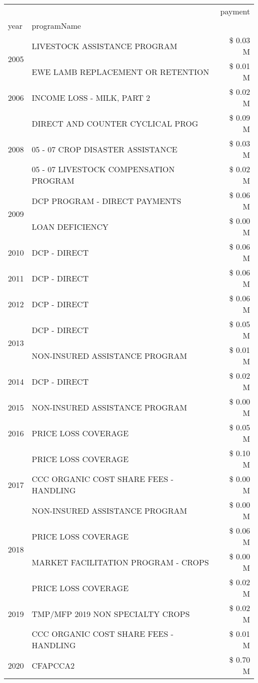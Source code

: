 \begin{tabular}{llr}
\toprule
 &  & payment \\
year & programName &  \\
\midrule
\multirow[t]{2}{*}{2005} & LIVESTOCK ASSISTANCE PROGRAM & \$ 0.03 M \\
 & EWE LAMB REPLACEMENT OR RETENTION & \$ 0.01 M \\
\cline{1-3}
2006 & INCOME LOSS - MILK, PART 2 & \$ 0.02 M \\
\cline{1-3}
\multirow[t]{3}{*}{2008} & DIRECT AND COUNTER CYCLICAL PROG & \$ 0.09 M \\
 & 05 - 07 CROP DISASTER ASSISTANCE & \$ 0.03 M \\
 & 05 - 07 LIVESTOCK COMPENSATION PROGRAM & \$ 0.02 M \\
\cline{1-3}
\multirow[t]{2}{*}{2009} & DCP PROGRAM - DIRECT PAYMENTS & \$ 0.06 M \\
 & LOAN DEFICIENCY & \$ 0.00 M \\
\cline{1-3}
2010 & DCP - DIRECT & \$ 0.06 M \\
\cline{1-3}
2011 & DCP - DIRECT & \$ 0.06 M \\
\cline{1-3}
2012 & DCP - DIRECT & \$ 0.06 M \\
\cline{1-3}
\multirow[t]{2}{*}{2013} & DCP - DIRECT & \$ 0.05 M \\
 & NON-INSURED ASSISTANCE PROGRAM & \$ 0.01 M \\
\cline{1-3}
2014 & DCP - DIRECT & \$ 0.02 M \\
\cline{1-3}
2015 & NON-INSURED ASSISTANCE PROGRAM & \$ 0.00 M \\
\cline{1-3}
2016 & PRICE LOSS COVERAGE & \$ 0.05 M \\
\cline{1-3}
\multirow[t]{3}{*}{2017} & PRICE LOSS COVERAGE & \$ 0.10 M \\
 & CCC ORGANIC COST SHARE FEES - HANDLING & \$ 0.00 M \\
 & NON-INSURED ASSISTANCE PROGRAM & \$ 0.00 M \\
\cline{1-3}
\multirow[t]{2}{*}{2018} & PRICE LOSS COVERAGE & \$ 0.06 M \\
 & MARKET FACILITATION PROGRAM - CROPS & \$ 0.00 M \\
\cline{1-3}
\multirow[t]{3}{*}{2019} & PRICE LOSS COVERAGE & \$ 0.02 M \\
 & TMP/MFP 2019 NON SPECIALTY CROPS & \$ 0.02 M \\
 & CCC ORGANIC COST SHARE FEES - HANDLING & \$ 0.01 M \\
\cline{1-3}
\multirow[t]{3}{*}{2020} & CFAPCCA2 & \$ 0.70 M \\

\end{tabular}
